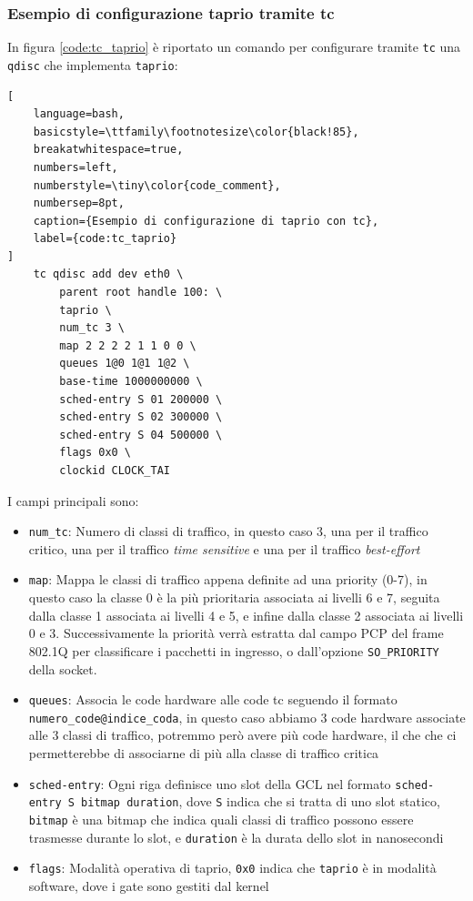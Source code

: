 \documentclass[12pt,a4paper,twoside]{book}
\begin{document}
\begin{onehalfspace}
\subsubsection{Esempio di configurazione taprio tramite tc}
In figura \ref{code:tc_taprio} è riportato un comando per configurare tramite \texttt{tc} una \texttt{qdisc} che implementa \texttt{taprio}:
\begin{lstlisting}[
    language=bash,
    basicstyle=\ttfamily\footnotesize\color{black!85},
    breakatwhitespace=true,
    numbers=left,
    numberstyle=\tiny\color{code_comment},
    numbersep=8pt,
    caption={Esempio di configurazione di taprio con tc},
    label={code:tc_taprio}
]
    tc qdisc add dev eth0 \
        parent root handle 100: \
        taprio \
        num_tc 3 \
        map 2 2 2 2 1 1 0 0 \
        queues 1@0 1@1 1@2 \
        base-time 1000000000 \
        sched-entry S 01 200000 \
        sched-entry S 02 300000 \
        sched-entry S 04 500000 \
        flags 0x0 \
        clockid CLOCK_TAI
\end{lstlisting}

I campi principali sono:
\begin{itemize}
    \item \texttt{num\_tc}: Numero di classi di traffico, in questo caso 3, una per il traffico critico, una per il traffico \textit{time sensitive} e una per il traffico \textit{best-effort}
    \item \texttt{map}: Mappa le classi di traffico appena definite ad una priority (0-7), in questo caso la classe 0 è la più prioritaria associata ai livelli 6 e 7, seguita dalla classe 1 associata ai livelli 4 e 5, e infine dalla classe 2 associata ai livelli 0 e 3. Successivamente la priorità verrà estratta dal campo PCP del frame 802.1Q per classificare i pacchetti in ingresso, o dall'opzione \texttt{SO\_PRIORITY} della socket.
    \item \texttt{queues}: Associa le code hardware alle code tc seguendo il formato \texttt{numero\_code@indice\_coda}, in questo caso abbiamo 3 code hardware associate alle 3 classi di traffico, potremmo però avere più code hardware, il che che ci permetterebbe di associarne di più alla classe di traffico critica
    \item \texttt{sched-entry}: Ogni riga definisce uno slot della GCL nel formato \texttt{sched-entry S bitmap duration}, dove \texttt{S} indica che si tratta di uno slot statico, \texttt{bitmap} è una bitmap che indica quali classi di traffico possono essere trasmesse durante lo slot, e \texttt{duration} è la durata dello slot in nanosecondi
    \item \texttt{flags}: Modalità operativa di taprio, \texttt{0x0} indica che \texttt{taprio} è in modalità software, dove i gate sono gestiti dal kernel
\end{itemize}


\end{onehalfspace}
\end{document}
